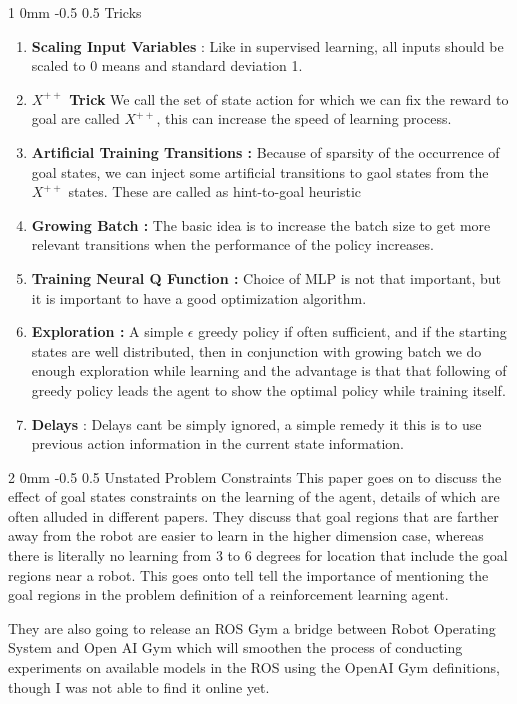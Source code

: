\documentclass[twocolumn,11pt]{article}
\makeatletter
\renewcommand{\section}{\@startsection
{section}%
{2}%
{0mm}%
{-0.5\baselineskip}%
{0.5\baselineskip}%
{\bfseries\color{blue}}} %
\renewcommand{\subsection}{\@startsection
{subsection}%
{1}%
{0mm}%
{-0.5\baselineskip}%
{0.5\baselineskip}%
{\bfseries\color{blue}}} %
\makeatother
\begin{document}
\subsection{Tricks}
\begin{enumerate}
\item \textbf{Scaling Input Variables} : Like in supervised learning, all inputs should be scaled to 0 means and standard deviation 1.
\item \textbf{$X^{++}$ Trick} We call the set of state action for which we can  fix the reward to goal are called $X^{++}$, this can increase the speed of learning process.
\item \textbf{Artificial Training Transitions : }
Because of sparsity of the occurrence of goal states, we can inject some artificial transitions to gaol states from the $X^{++}$ states. These are called as hint-to-goal heuristic

\item  \textbf{Growing Batch : } The basic idea is to increase the batch size to get more relevant transitions when  the performance of the policy increases. 
\item \textbf{Training Neural Q  Function : } Choice of MLP is not that important, but it is important to have a good optimization algorithm.
\item \textbf{Exploration : } A simple $\epsilon$ greedy policy if often sufficient, and if the  starting states are well distributed, then in conjunction with growing batch we do enough exploration while learning and the advantage is that that following of greedy policy leads the agent to show the optimal policy while training itself.
\item \textbf{Delays} : Delays cant be simply ignored,  a simple remedy it this is to use previous action information in the current state information.
\end{enumerate}

\section{Unstated Problem  Constraints}
This paper goes on to discuss the effect of goal states constraints on the learning of the agent,  details of which are often  alluded in different papers. They discuss that goal regions that are farther away from  the robot are easier to learn  in the higher dimension case, whereas there is literally no learning from 3 to 6  degrees for location that include the goal regions near a robot. This goes onto tell tell the importance of mentioning the goal regions in the problem definition of a reinforcement learning agent. 

They are also going to release an ROS Gym a bridge between Robot Operating System and Open AI Gym which will smoothen the process of conducting experiments on available models in the ROS using the OpenAI Gym definitions, though I was not able to find  it online yet. 



\end{document}
